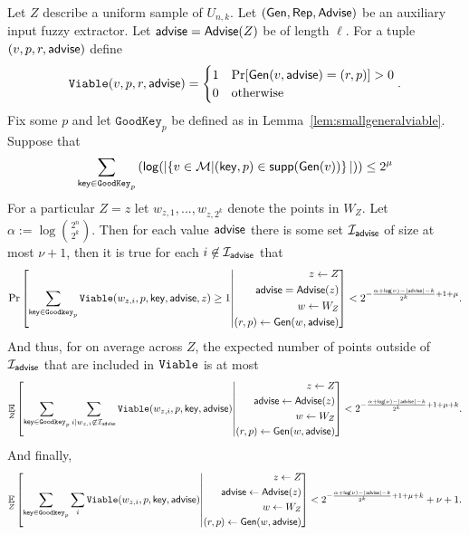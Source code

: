 \begin{corollary}
\label{corollary:info loss}
Let $Z$ describe a uniform sample of $U_{n,k}$.  Let $({\mathsf{Gen}}, {\mathsf{Rep}}, {\mathsf{Advise}})$ be an auxiliary input fuzzy extractor.  Let ${\mathsf{advise}} = {\mathsf{Advise}}(Z)$ be of length $\ell$.  For a tuple $(v, p, r, {\mathsf{advise}})$ define 
\[
\mathtt{Viable}(v, p, r, {\mathsf{advise}}) = \begin{cases} 1& \Pr[{\mathsf{Gen}}(v, {\mathsf{advise}}) = (r, p)]>0\\0&\text{otherwise}\end{cases}.\]
Fix some $p$ and let $\mathtt{GoodKey}_p$ be defined as in Lemma~\ref{lem:smallgeneralviable}. Suppose that 
\[
   \sum_{\mathsf{key}\in \mathtt{GoodKey}_p} \left( \mathsf{log}\!\left(|\!\left\{ v \in \mathcal{M}|\!\left(\mathsf{key}, p\right) \in \mathsf{supp}\!\left(\mathsf{Gen}(v)\right) \right\}|\right)\right) \le 2^\mu 
 \]
 For a particular $Z=z$ let $w_{z,1},..., w_{z,2^k}$ denote the points in $W_Z$. Let $\alpha:= \log {2^n\choose 2^k}$.  
 Then for each value ${\mathsf{advise}}$ there is some set $\mathcal{I}_{{\mathsf{advise}}}$ of size at most $\nu+1$, then it is true for each $i\not \in \mathcal{I}_{\mathsf{advise}}$ that
\[
\Pr\left[\sum_{\mathsf{key} \in \mathtt{Goodkey}_p} \mathtt{Viable}(w_{z,i}, p, \mathsf{key}, {\mathsf{advise}}, z) \ge 1\middle| \begin{aligned} z\leftarrow Z\\ {\mathsf{advise}}= {\mathsf{Advise}}(z)\\w\leftarrow W_Z\\(r, p)\leftarrow {\ensuremath{\mathsf{Gen}}}(w, {\mathsf{advise}}) \end{aligned} \right]< 2^{-\frac{\alpha+\mathsf{log}\!\left(\nu\right)-|{\mathsf{advise}}|-k}{2^k}+1+\mu}.
\]
And thus, for on average across $Z$, the expected number of points outside of $\mathcal{I}_{\mathsf{advise}}$ that are included in $\mathtt{Viable}$ is at most 
\begin{align*}
\operatorname*{\mathbb{E}}_{Z} \left[\sum_{\mathsf{key} \in \mathtt{Goodkey}_p}\sum_{i | w_{z,i}\not\in\mathcal{I}_{\mathsf{advise}}} \mathtt{Viable}(w_{z,i}, p, \mathsf{key}, {\mathsf{advise}}) \middle| \begin{aligned} z\leftarrow Z\\ {\mathsf{advise}}\leftarrow {\ensuremath{\mathsf{Advise}}}(z)\\w\leftarrow W_Z\\(r, p)\leftarrow {\ensuremath{\mathsf{Gen}}}(w, {\mathsf{advise}})\end{aligned} \right]< 2^{-\frac{\alpha+\mathsf{log}\!\left(\nu\right) - |{\mathsf{advise}}|-k}{2^k}+1+\mu+k}.
\end{align*}
And finally, 
\begin{align*}
\operatorname*{\mathbb{E}}_{Z} \left[\sum_{\mathsf{key} \in \mathtt{Goodkey}_p}\sum_{i }  \mathtt{Viable}(w_{z,i}, p, \mathsf{key}, {\mathsf{advise}}) \middle| \begin{aligned} z\leftarrow Z\\ {\mathsf{advise}}\leftarrow {\ensuremath{\mathsf{Advise}}}(z)\\w\leftarrow W_Z\\(r, p)\leftarrow {\ensuremath{\mathsf{Gen}}}(w, {\mathsf{advise}})\end{aligned} \right]< 2^{-\frac{\alpha+\mathsf{log}\!\left(\nu\right)-|{\mathsf{advise}}|-k}{2^k}+1+\mu+k}+\nu+1.
\end{align*}

\end{corollary}



